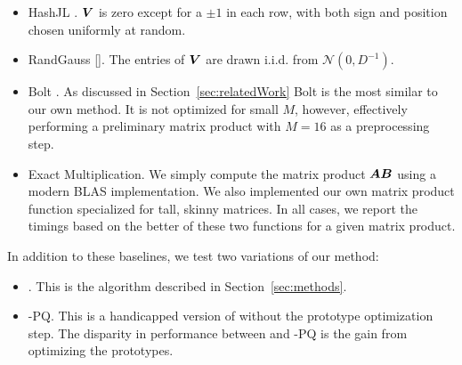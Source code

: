 \begin{itemize}
    \item HashJL \cite{hashjl}. $\bm{V}$ is zero except for a $\pm 1$ in each row, with both sign and position chosen uniformly at random.
    \item RandGauss []. The entries of $\bm{V}$ are drawn i.i.d. from $\mathcal{N}(0, D^{-1})$.
    \item Bolt \cite{bolt}. As discussed in Section~\ref{sec:relatedWork} Bolt is the most similar to our own method. It is not optimized for small $M$, however, effectively performing a preliminary matrix product with $M=16$ as a preprocessing step.
    \item Exact Multiplication. We simply compute the matrix product $\bm{A}\bm{B}$ using a modern BLAS implementation. We also implemented our own matrix product function specialized for tall, skinny matrices. In all cases, we report the timings based on the better of these two functions for a given matrix product.
\end{itemize}

In addition to these baselines, we test two variations of our method:
\begin{itemize}
    \item \ours. This is the algorithm described in Section~\ref{sec:methods}.
    \item \ours-PQ. This is a handicapped version of \oursp without the prototype optimization step. The disparity in performance between \oursp and \ours-PQ is the gain from optimizing the prototypes.
\end{itemize}

